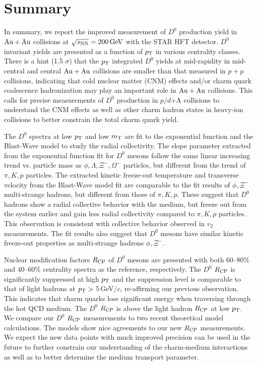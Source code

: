 \documentclass[%
 reprint,	
 amsmath,amssymb,
 aps,
 prc,
]{revtex4-1}
\begin{document}
\section{\label{summary}Summary}

In summary, we report the improved measurement of $D^0$ production yield in ${\rm{Au + Au}}$ collisions at ${\sqrt{s_{\rm NN}} = \rm{200\,GeV}}$ with the STAR HFT detector. $D^0$ invariant yields are presented as a function of $p_{\rm T}$ in various centrality classes. There is a hint (1.5 $\sigma$) that the $p_{\rm T}$ integrated $D^0$ yields at mid-rapidity in mid-central and central ${\rm{Au + Au}}$ collisions are smaller than that measured in $p + p$ collisions, indicating that cold nuclear matter (CNM) effects and/or charm quark coalescence hadronization may play an important role in ${\rm{Au + Au}}$ collisions. This calls for precise measurements of $D^0$ production in $p/d$+A collisions to understand the CNM effects as well as other charm hadron states in heavy-ion collisions to better constrain the total charm quark yield.

The $D^0$ spectra at low $p_{\rm T}$ and low $m_{\rm T}$ are fit to the exponential function and the Blast-Wave model to study the radial collectivity. The slope parameter extracted from the exponential function fit for $D^0$ mesons follow the same linear increasing trend vs. particle mass as $\phi,\Lambda,\Xi^-,\Omega^-$ particles, but different from the trend of $\pi,K,p$ particles. The extracted kinetic freeze-out temperature and transverse velocity from the Blast-Wave model fit are comparable to the fit results of $\phi,\Xi^-$ multi-strange hadrons, but different from those of $\pi,K,p$. These suggest that $D^0$ hadrons show a radial collective behavior with the medium, but freeze out from the system earlier and gain less radial collectivity compared to $\pi,K,p$ particles. This observation is consistent with collective behavior observed in $v_2$ measurements. The fit results also suggest that $D^0$ mesons have similar kinetic freeze-out properties as multi-strange hadrons $\phi,\Xi^-$.

Nuclear modification factors $R_{\rm CP}$ of $D^0$ mesons are presented with both 60--80\% and 40--60\% centrality spectra as the reference, respectively. The $D^0$ $R_{\rm CP}$ is significantly suppressed at high $p_{\rm T}$ and the suppression level is comparable to that of light hadrons at $p_{\rm T}>$ 5\,GeV/$c$, re-affirming our previous observation. This indicates that charm quarks lose significant energy when traversing through the hot QCD medium. The $D^0$ $R_{\rm CP}$ is above the light hadron $R_{\rm CP}$ at low $p_{\rm T}$. We compare our $D^0$ $R_{\rm CP}$ measurements to two recent theoretical model calculations. The models show nice agreements to our new $R_{\rm CP}$ measurements. We expect the new data points with much improved precision can be used in the future to further constrain our understanding of the charm-medium interactions as well as to better determine the medium transport parameter.
\end{document}
